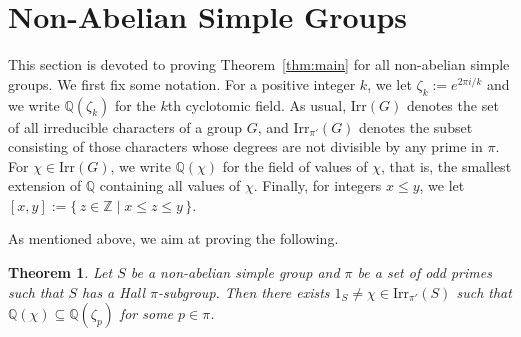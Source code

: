 \documentclass[12pt]{amsart}
\newtheorem{theorem}{Theorem}[section]
\theoremstyle{definition}
\numberwithin{equation}{section}
\newcommand{\Irr}{{\mathrm {Irr}}}
\newcommand{\QQ}{{\mathbb Q}}
\newcommand{\ZZ}{{\mathbb Z}}
\newcommand{\Al}{\textup{\textsf{A}}}
\newcommand{\Sy}{\textup{\textsf{S}}}
\begin{document}
%


\section{Non-Abelian Simple Groups}

This section is devoted to proving Theorem~\ref{thm:main} for all
non-abelian simple groups. We first fix some notation. For a
positive integer $k$, we %
let $\zeta_k:=e^{2\pi i/k}$ and %
we write $\QQ(\zeta_k)$ for the $k$th
cyclotomic field. As usual, $\Irr(G)$ denotes
the set of all irreducible characters of a group $G$, and
$\Irr_{\pi'}(G)$ denotes the subset consisting of those characters
whose degrees are not divisible by any prime in $\pi$. For
$\chi\in\Irr(G)$, we write $\QQ(\chi)$ for the field of values of
$\chi$, that is, the smallest extension of $\QQ$ containing all
values of $\chi$. Finally, for integers $x\le y$, we let
$[x,y]:=\{\,z\in\ZZ \mid x\le z\le y\,\}$.

As mentioned above, we aim at proving the following.

\begin{theorem}\label{thm:simple}
Let $S$ be a non-abelian simple group and $\pi$ be a set of odd
primes such that $S$ has a Hall $\pi$-subgroup. Then there exists
$1_S\neq\chi\in\Irr_{\pi'}(S)$ such that
$\QQ(\chi)\subseteq\QQ(\zeta_p)$ for %
some $p\in\pi$.
\end{theorem}
\end{document}
